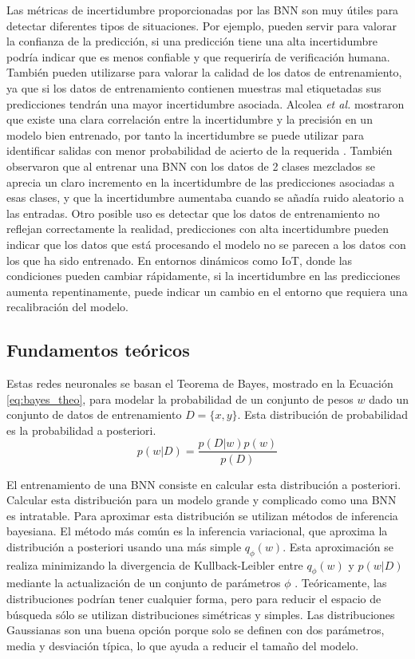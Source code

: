 Las métricas de incertidumbre proporcionadas por las BNN son muy útiles para detectar diferentes tipos de situaciones. Por ejemplo, pueden servir para valorar la confianza de la predicción, si una predicción tiene una alta incertidumbre podría indicar que es menos confiable y que requeriría de verificación humana. También pueden utilizarse para valorar la calidad de los datos de entrenamiento, ya que si los datos de entrenamiento contienen muestras mal etiquetadas sus predicciones tendrán una mayor incertidumbre asociada. Alcolea \emph{et al.} mostraron que existe una clara correlación entre la incertidumbre y la precisión en un modelo bien entrenado, por tanto la incertidumbre se puede utilizar para identificar salidas con menor probabilidad de acierto de la requerida \cite{bnn_hyper_uncertainty}. También observaron que al entrenar una BNN con los datos de 2 clases mezclados se aprecia un claro incremento en la incertidumbre de las predicciones asociadas a esas clases, y que la incertidumbre aumentaba cuando se añadía ruido aleatorio a las entradas. Otro posible uso es detectar que los datos de entrenamiento no reflejan correctamente la realidad, predicciones con alta incertidumbre pueden indicar que los datos que está procesando el modelo no se parecen a los datos con los que ha sido entrenado. En entornos dinámicos como IoT, donde las condiciones pueden cambiar rápidamente, si la incertidumbre en las predicciones aumenta repentinamente, puede indicar un cambio en el entorno que requiera una recalibración del modelo.

\subsection{Fundamentos teóricos} \label{sec:bnn_formulas}

Estas redes neuronales se basan el Teorema de Bayes,  mostrado en la Ecuación \ref{eq:bayes_theo}, para modelar la probabilidad de un conjunto de pesos $w$ dado un conjunto de datos de entrenamiento $D = \{x, y\}$. Esta distribución de probabilidad es la probabilidad a posteriori.
\begin{equation} \label{eq:bayes_theo}
p(w|D) = \dfrac{p(D|w) p(w)}{p(D)}
\end{equation}

El entrenamiento de una BNN consiste en calcular esta distribución a posteriori. Calcular esta distribución para un modelo grande y complicado como una BNN es intratable. Para aproximar esta distribución se utilizan métodos de inferencia bayesiana. El método más común es la inferencia variacional, que aproxima la distribución a posteriori usando una más simple $q_{\phi}(w)$. Esta aproximación se realiza minimizando la divergencia de Kullback-Leibler entre $q_{\phi}(w)$ y $p(w|D)$ mediante la actualización de un conjunto de parámetros $\phi$ \cite{kl_divergence}. Teóricamente, las distribuciones podrían tener cualquier forma, pero para reducir el espacio de búsqueda sólo se utilizan distribuciones simétricas y simples. Las distribuciones Gaussianas son una buena opción porque solo se definen con dos parámetros, media y desviación típica, lo que ayuda a reducir el tamaño del modelo.

